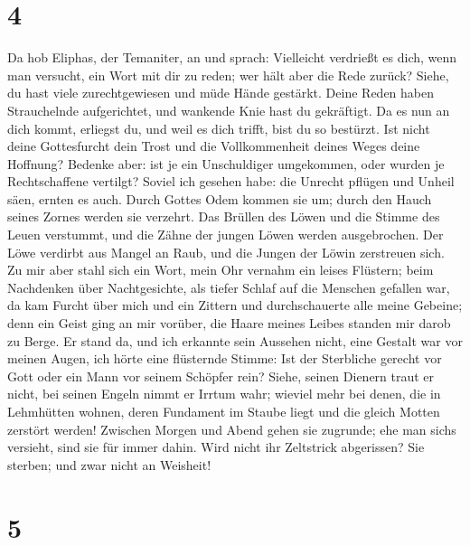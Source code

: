 \hypertarget{section-3}{%
\section{4}\label{section-3}}

 Da hob Eliphas, der Temaniter, an und sprach:
 Vielleicht verdrießt es dich, wenn man versucht, ein Wort
mit dir zu reden; wer hält aber die Rede zurück?  Siehe,
du hast viele zurechtgewiesen und müde Hände gestärkt. 
Deine Reden haben Strauchelnde aufgerichtet, und wankende Knie hast du
gekräftigt.  Da es nun an dich kommt, erliegst du, und
weil es dich trifft, bist du so bestürzt.  Ist nicht deine
Gottesfurcht dein Trost und die Vollkommenheit deines Weges deine
Hoffnung?  Bedenke aber: ist je ein Unschuldiger
umgekommen, oder wurden je Rechtschaffene vertilgt? 
Soviel ich gesehen habe: die Unrecht pflügen und Unheil säen, ernten es
auch.  Durch Gottes Odem kommen sie um; durch den Hauch
seines Zornes werden sie verzehrt.  Das Brüllen des Löwen
und die Stimme des Leuen verstummt, und die Zähne der jungen Löwen
werden ausgebrochen.  Der Löwe verdirbt aus Mangel an
Raub, und die Jungen der Löwin zerstreuen sich.  Zu mir
aber stahl sich ein Wort, mein Ohr vernahm ein leises Flüstern;
 beim Nachdenken über Nachtgesichte, als tiefer Schlaf
auf die Menschen gefallen war,  da kam Furcht über mich
und ein Zittern und durchschauerte alle meine Gebeine; 
denn ein Geist ging an mir vorüber, die Haare meines Leibes standen mir
darob zu Berge.  Er stand da, und ich erkannte sein
Aussehen nicht, eine Gestalt war vor meinen Augen, ich hörte eine
flüsternde Stimme:  Ist der Sterbliche gerecht vor Gott
oder ein Mann vor seinem Schöpfer rein?  Siehe, seinen
Dienern traut er nicht, bei seinen Engeln nimmt er Irrtum wahr;
 wieviel mehr bei denen, die in Lehmhütten wohnen, deren
Fundament im Staube liegt und die gleich Motten zerstört werden!
 Zwischen Morgen und Abend gehen sie zugrunde; ehe man
sich\textquotesingle s versieht, sind sie für immer dahin.
 Wird nicht ihr Zeltstrick abgerissen? Sie sterben; und
zwar nicht an Weisheit!

\hypertarget{section-4}{%
\section{5}\label{section-4}}

